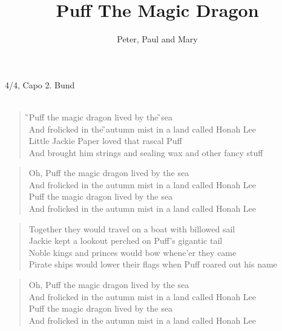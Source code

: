 \documentclass[a4paper,oneside,onecolumn]{article}
\author{Peter, Paul and Mary}
\title{Puff The Magic Dragon}
\date{}
\begin{document}
\maketitle
\thispagestyle{empty}

4/4, Capo 2. Bund\\
\mbox{
}\\

\begin{verse}
\G{}Puff the magic \Hm{}dragon \C{}lived \Cstar{}by the \G{}sea\\
And \C{}frolicked in the \G{}autumn \Em{}mist in a \As{}land called Honah \Ds{}Lee\\
Little Jackie Paper loved that rascal Puff\\
And brought him strings and sealing wax and other fancy stuff\\
\end{verse}
\begin{verse}
Oh, Puff the magic dragon lived by the sea\\
And frolicked in the autumn mist in a land called Honah Lee\\
Puff the magic dragon lived by the sea\\
And frolicked in the autumn mist in a land called Honah Lee\\

\end{verse}
\begin{verse}
Together they would travel on a boat with billowed sail\\
Jackie kept a lookout perched on Puff's gigantic tail\\
Noble kings and princes would bow whene'er they came\\
Pirate ships would lower their flags when Puff roared out his name\\

\end{verse}
\begin{verse}

Oh, Puff the magic dragon lived by the sea\\
And frolicked in the autumn mist in a land called Honah Lee\\
Puff the magic dragon lived by the sea\\
And frolicked in the autumn mist in a land called Honah Lee\\

\end{verse}
\end{document}
